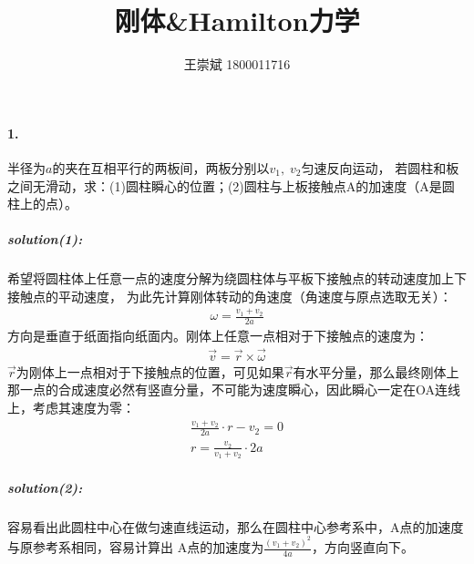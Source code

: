 \documentclass[a4paper]{ctexart}
\title{\textbf{刚体\&\;Hamilton力学}}
\author{王崇斌 1800011716}
\date{}
\begin{document}
    \pagestyle{fancy}
	\chead{}
	\rhead{}
	\maketitle
    \thispagestyle{fancy}
    \paragraph{1.}
    半径为$a$的夹在互相平行的两板间，两板分别以$v_{1},\;v_{2}$匀速反向运动，
    若圆柱和板之间无滑动，求：(1)圆柱瞬心的位置；(2)圆柱与上板接触点A的加速度（A是圆柱上的点）。
    \subparagraph{solution\;(1):}
    希望将圆柱体上任意一点的速度分解为绕圆柱体与平板下接触点的转动速度加上下接触点的平动速度，
    为此先计算刚体转动的角速度（角速度与原点选取无关）：
    \begin{align}
        \omega = \frac{v_{1} + v_{2}}{2a}
    \end{align}
    方向是垂直于纸面指向纸面内。刚体上任意一点相对于下接触点的速度为：
    \begin{align}
        \vec{v} = \vec{r} \times \vec{\omega}
    \end{align}
    $\vec{r}$为刚体上一点相对于下接触点的位置，可见如果$\vec{r}$有水平分量，那么最终刚体上
    那一点的合成速度必然有竖直分量，不可能为速度瞬心，因此瞬心一定在OA连线上，考虑其速度为零：
    \begin{align}
        \frac{v_{1} + v_{2}}{2a}\cdot r - v_{2}=0\\
        r = \frac{v_{2}}{v_{1} + v_{2}}\cdot 2a
    \end{align}
    \subparagraph{solution\;(2):}
    容易看出此圆柱中心在做匀速直线运动，那么在圆柱中心参考系中，A点的加速度与原参考系相同，容易计算出
    A点的加速度为$\frac{(v_{1} + v_{2})^{2}}{4a}$，方向竖直向下。
    \\
\end{document}
